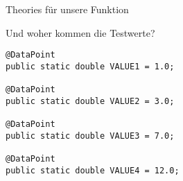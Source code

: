 \begin{frame}[fragile]{Theories für unsere Funktion}



Und woher kommen die Testwerte?

\begin{lstlisting}
@DataPoint
public static double VALUE1 = 1.0;

@DataPoint
public static double VALUE2 = 3.0;

@DataPoint
public static double VALUE3 = 7.0;

@DataPoint
public static double VALUE4 = 12.0;
\end{lstlisting}

\end{frame}



